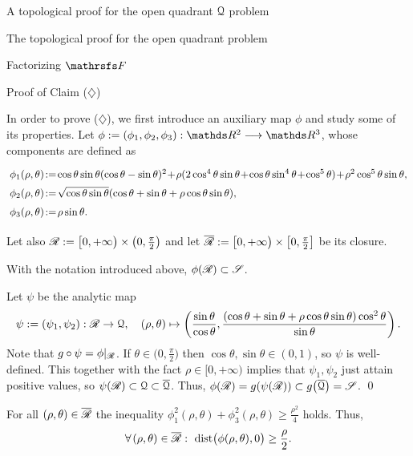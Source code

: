 \documentclass[11pt, a4paper, english, twoside, notitlepage, openright]{report}
\begin{document}
\begin{chapter}{A topological proof for the open quadrant $\mathcal{Q}$ problem}
\begin{section}{The topological proof for the open quadrant problem}
\begin{subsection}{Factorizing $\FFF$}
\end{subsection}

\begin{subsection}{Proof of Claim ($\diamondsuit$)}\label{mainsubsectop}

In order to prove ($\diamondsuit$), we first introduce an auxiliary map $\phi$ and study some of its properties. Let $\phi:=(\phi_1,\phi_2,\phi_3):\R^2\longrightarrow\R^3$, whose components are defined as
$$
\arraycolsep=2pt\def\arraystretch{1.5}
\begin{array}{l}
\phi_1(\rho,\theta)\!:=\!\cos\theta\sin\theta(\cos\theta-
\sin\theta)^2\!+\!\rho(2\cos^4\theta\sin\theta\!+\!\cos\theta\sin^4\theta\!+\!\cos^5\theta)\!+\!\rho^2\cos^5\theta\sin\theta,\\
\phi_2(\rho,\theta)\!:=\!\sqrt{\cos\theta\sin\theta}(\cos\theta+\sin\theta+\rho\cos\theta\sin\theta),\\
\phi_3(\rho,\theta)\!:=\!\rho\sin\theta.
\end{array}
$$

Let also $\mathscr{R}:=\big[0,+\infty\big)\times\big(0,\tfrac{\pi}{2}\big)$ and let $\overline{\mathscr{R}}:=\big[0,+\infty\big)\times\big[0,\tfrac{\pi}{2}\big]$ be its closure.

\vspace{1mm}

\begin{lemma}\label{phiContainsS}
With the notation introduced above, $\phi(\mathscr{R})\subset\mathscr{S}$.
\begin{Proof}
Let $\psi$ be the analytic map
$$
\psi:=(\psi_1,\psi_2):\mathscr{R}\to\mathcal{Q},\quad(\rho,\theta)\mapsto\left(\frac{\sin\theta}{\cos\theta},\frac{(\cos\theta+\sin\theta+\rho\cos\theta
\sin\theta)\cos^2\theta}{\sin\theta}\right).
$$
Note that $g\circ\psi=\phi|_{\mathscr{R}}$. If $\theta\in\big(0,\tfrac{\pi}{2}\big)$ then $\cos\theta,\sin\theta\in(0,1)$, so $\psi$ is well-defined. This together with the fact $\rho\in[0,+\infty)$ implies that $\psi_1,\psi_2$ just attain positive values, so $\psi(\mathscr{R})\subset \mathcal{Q}\subset \overline{\mathcal{Q}}$. Thus, $\phi({\mathscr{R}})=g(\psi(\mathscr{R}))\subset g\big(\overline{\mathcal{Q}}\big)=\mathscr{S}$.
\qed
\end{Proof}
\end{lemma}

\vspace{1mm}

\begin{lemma}\label{phidist}
For all $(\rho,\theta)\in\overline{\mathscr{R}}$ the inequality $\phi_1^2(\rho,\theta)+\phi_3^2(\rho,\theta)\ge\frac{\rho^2}{4}$ holds. Thus,
\begin{equation}\label{eq:ineqphi}
\forall (\rho,\theta)\in\overline{\Rr}:\  \text{dist}\big(\phi(\rho,\theta),0\big)\geq\frac{\rho}{2}.
\end{equation}


\end{lemma}
\end{subsection}
\end{section}
\end{chapter}
\end{document}
